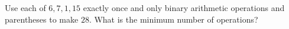 Use each of $6,7,1,15$ exactly once and only binary arithmetic operations and parentheses to make $28$. What is the minimum number of operations?
